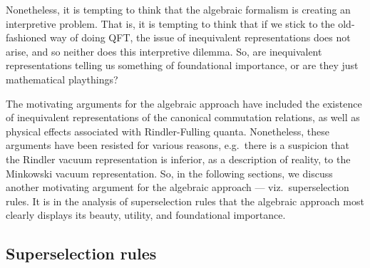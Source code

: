 \documentclass[12pt]{article}
\theoremstyle{definition}
\theoremstyle{definition}
\theoremstyle{remark}
\begin{document}
Nonetheless, it is tempting to think that the algebraic formalism is
creating an interpretive problem.  That is, it is tempting to think
that if we stick to the old-fashioned way of doing QFT, the issue of
inequivalent representations does not arise, and so neither does this
interpretive dilemma.  So, are inequivalent representations telling us
something of foundational importance, or are they just mathematical
playthings?  

The motivating arguments for the algebraic approach have included the
existence of inequivalent representations of the canonical commutation
relations, as well as physical effects associated with Rindler-Fulling
quanta.  Nonetheless, these arguments have been resisted for various
reasons, e.g.\ there is a suspicion that the Rindler vacuum
representation is inferior, as a description of reality, to the
Minkowski vacuum representation.  So, in the following sections, we
discuss another motivating argument for the algebraic approach ---
viz.\ superselection rules.  It is in the analysis of superselection
rules that the algebraic approach most clearly displays its beauty,
utility, and foundational importance.  

\label{sec-DHR}

 \subsection{Superselection rules}
\end{document}
